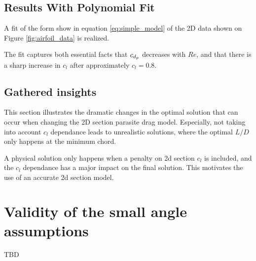 \documentclass[letterpaper,12pt]{article}
\begin{document}
\subsection{Results With Polynomial Fit}

A fit of the form show in equation \ref{eq:simple_model} of the 2D data shown on Figure \ref{fig:airfoil_data} is realized. 

The fit captures both essential facts that ${c_{d_p}}_{\bf }$ decreases with $Re$, and that there is a sharp increase in $c_l$ after approximately $c_l = 0.8$.




\subsection{Gathered insights}

This section illustrates the dramatic changes in the optimal solution that can occur when changing the 2D section parasite drag model.
Especially, not taking into account $c_l$ dependance leads to unrealistic solutions, where the optimal $L/D$ only happens at the minimum chord.

A physical solution only happens when a penalty on 2d section $c_l$ is included, and the $c_l$ dependance has a major impact on the final solution. This motivates the use of an accurate 2d section model.


\appendix

\section{Validity of the small angle assumptions}
\label{apx:smallangle}
TBD
\end{document}
